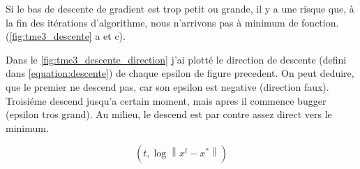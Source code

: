 \documentclass[a4paper,12pt]{article}
\begin{document}
Si le bas de descente de gradient est trop petit ou grande, 
il y a une risque que, à la fin des itérations d'algorithme, nous n'arrivons pas à minimum de fonction.
(\autoref{fig:tme3_descente} a et c).

Dans le \autoref{fig:tme3_descente_direction} j'ai plotté le direction de descente (defini dans \autoref{equation:descente}) de chaque epsilon de figure
precedent. On peut deduire, que le premier ne descend pas, car son epsilon est negative (direction faux).
Troisiéme descend jusqu'a certain moment, mais apres il commence bugger (epsilon tros grand).
Au milieu, le descend est par contre assez direct vers le minimum.

\begin{equation}
\label{equation:descente}
	\left ( t, \log \left \| x^{t} - x^{*} \right  \| \right )
\end{equation}
\end{document}
